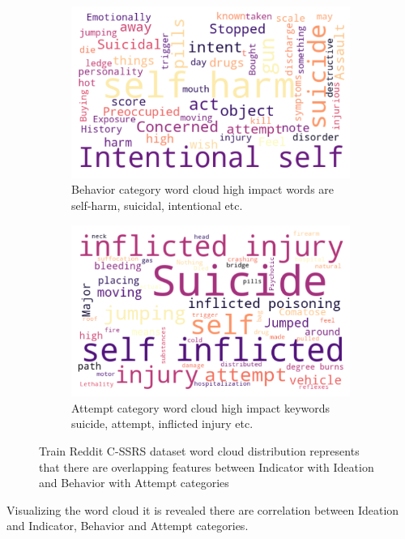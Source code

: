 \documentclass[sn-mathphys,Numbered]{sn-jnl}%
\theoremstyle{thmstyleone}%
\theoremstyle{thmstyletwo}%
\theoremstyle{thmstylethree}%
\begin{document}
\begin{figure}[h!]
\begin{subfigure}{0.45\textwidth}
\end{subfigure}      
\centering
\begin{subfigure}{0.45\textwidth}
    \includegraphics[width=\textwidth]{Behavior_word_cloud.png}
    \caption{Behavior category word cloud high impact words are self-harm, suicidal, intentional etc.}
    \label{Redditdist}
\end{subfigure}
\hfill
\begin{subfigure}{0.45\textwidth}
    \includegraphics[width=\textwidth]{Attempt_word_cloud.png}
    \caption{Attempt category word cloud high impact keywords suicide, attempt, inflicted injury etc.}
    \label{Twitterdist}
\end{subfigure}   
\caption{Train Reddit C-SSRS dataset word cloud distribution represents that there are overlapping features between Indicator with Ideation and Behavior with Attempt categories}
\label{Redditdist_Twitterdist_wordcloud}
\end{figure}
Visualizing the word cloud it is revealed there are correlation between Ideation and Indicator, Behavior and Attempt categories.  
\end{document}
